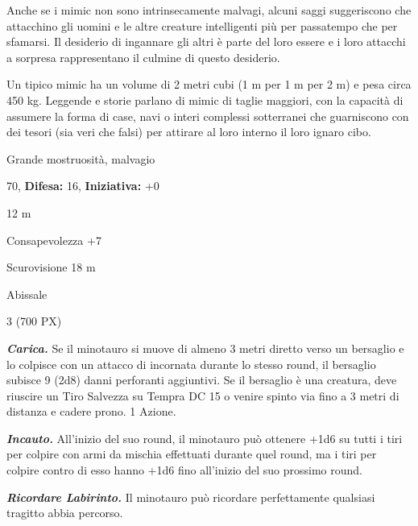 \begin{multicols}{2}
{Anche se i mimic non sono intrinsecamente malvagi, alcuni saggi suggeriscono che attacchino gli uomini e le altre creature intelligenti più per passatempo che per sfamarsi. Il desiderio di ingannare gli altri è parte del loro essere e i loro attacchi a sorpresa rappresentano il culmine di questo desiderio.

Un tipico mimic ha un volume di 2 metri cubi (1 m per 1 m per 2 m) e pesa circa 450 kg. Leggende e storie parlano di mimic di taglie maggiori, con la capacità di assumere la forma di case, navi o interi complessi sotterranei che guarniscono con dei tesori (sia veri che falsi) per attirare al loro interno il loro ignaro cibo.

\noindent
\begin{description}[noitemsep, topsep=0pt, parsep=0pt, partopsep=0pt, leftmargin=0cm, labelwidth=2.2cm]
	\item[\textbf{Taglia/Tipo:}] Grande mostruosità, malvagio
	\item[\textbf{Caratt.:}] 
	\item[\textbf{Punti Ferita:}] 70,  \textbf{Difesa:} 16,  \textbf{Iniziativa:} +0
	\item[\textbf{Movimento:}] 12 m
	\item[\textbf{Tiri Salvez.:}] 
	\item[\textbf{Comp.:}] Consapevolezza +7
	\item[\textbf{Sensi:}] Scurovisione 18 m
	\item[\textbf{Linguaggi:}] Abissale
	\item[\textbf{Sfida:}] 3 (700 PX)\smallskip
\end{description}

\emph{\textbf{Carica.}} Se il minotauro si muove di almeno 3 metri diretto verso un bersaglio e lo colpisce con un attacco di incornata durante lo stesso round, il bersaglio subisce 9 (2d8) danni perforanti aggiuntivi. Se il bersaglio è una creatura, deve riuscire un Tiro Salvezza su Tempra DC 15 o venire spinto via fino a 3 metri di distanza e cadere prono. 1 Azione.

\emph{\textbf{Incauto.}} All'inizio del suo round, il minotauro può ottenere +1d6 su tutti i tiri per colpire con armi da mischia effettuati durante quel round, ma i tiri per colpire contro di esso hanno +1d6 fino all'inizio del suo prossimo round.

\emph{\textbf{Ricordare Labirinto.}} Il minotauro può ricordare perfettamente qualsiasi tragitto abbia percorso.

}
\end{multicols}

